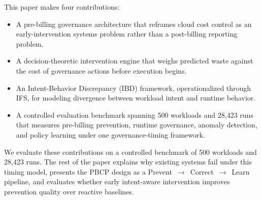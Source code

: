 This paper makes four contributions:
\begin{itemize}
  \item A pre-billing governance architecture that reframes cloud cost control as an early-intervention systems problem rather than a post-billing reporting problem.
  \item A decision-theoretic intervention engine that weighs predicted waste against the cost of governance actions before execution begins.
  \item An Intent-Behavior Discrepancy (IBD) framework, operationalized through IFS, for modeling divergence between workload intent and runtime behavior.
  \item A controlled evaluation benchmark spanning 500 workloads and 28{,}423 runs that measures pre-billing prevention, runtime governance, anomaly detection, and policy learning under one governance-timing framework.
\end{itemize}

We evaluate these contributions on a controlled benchmark of 500 workloads and 28{,}423 runs. The rest of the paper explains why existing systems fail under this timing model, presents the PBCP design as a Prevent~$\rightarrow$~Correct~$\rightarrow$~Learn pipeline, and evaluates whether early intent-aware intervention improves prevention quality over reactive baselines.
